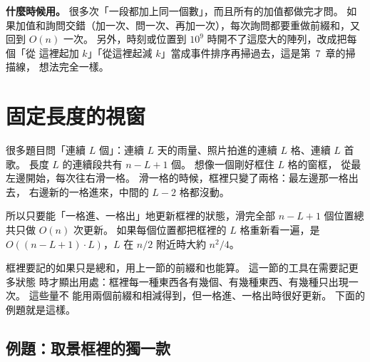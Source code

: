 \textbf{什麼時候用。} 很多次「一段都加上同一個數」，而且所有的加值都做完才問。
如果加值和詢問交錯（加一次、問一次、再加一次），每次詢問都要重做前綴和，又回到
$O(n)$ 一次。 另外，時刻或位置到 $10^9$ 時開不了這麼大的陣列，改成把每個「從
這裡起加 $k$」「從這裡起減 $k$」當成事件排序再掃過去，這是第~7~章的掃描線，
想法完全一樣。

\section{固定長度的視窗}
\label{sec:ps-fixed}

很多題目問「連續 $L$ 個」：連續 $L$ 天的雨量、照片拍進的連續 $L$ 格、連續 $L$
首歌。 長度 $L$ 的連續段共有 $n - L + 1$ 個。 想像一個剛好框住 $L$ 格的窗框，
從最左邊開始，每次往右滑一格。 滑一格的時候，框裡只變了兩格：最左邊那一格出去，
右邊新的一格進來，中間的 $L - 2$ 格都沒動。

\begin{center}
\label{fig:ps-slide}
\end{center}

所以只要能「一格進、一格出」地更新框裡的狀態，滑完全部 $n - L + 1$ 個位置總
共只做 $O(n)$ 次更新。 如果每個位置都把框裡的 $L$ 格重新看一遍，是
$O((n - L + 1) \cdot L)$，$L$ 在 $n / 2$ 附近時大約 $n^2 / 4$。

框裡要記的如果只是總和，用上一節的前綴和也能算。 這一節的工具在需要記更多狀態
時才顯出用處：框裡每一種東西各有幾個、有幾種東西、有幾種只出現一次。 這些量不
能用兩個前綴和相減得到，但一格進、一格出時很好更新。 下面的例題就是這樣。

\subsection{例題：取景框裡的獨一款}
\label{sec:ps-ex-frame}

